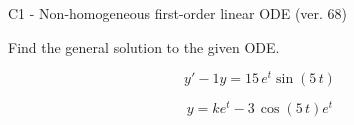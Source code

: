 \begin{exercise}
  \begin{exerciseTitle}C1 - Non-homogeneous first-order linear ODE (ver. 68)\end{exerciseTitle}
  \begin{exerciseStatement}
    
Find the general solution to the given ODE.

    
\[y'-1y= 15 \, e^{t} \sin\left(5 \, t\right)\]

  \end{exerciseStatement}
  \begin{exerciseAnswer}
    
\[y= k e^{t} - 3 \, \cos\left(5 \, t\right) e^{t}\]

  \end{exerciseAnswer}
\end{exercise}